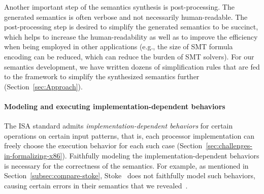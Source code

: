 %
%

Another important step of the semantics synthesis is post-processing. The generated semantics is often verbose and not necessarily human-readable. The post-processing step is desired to simplify the generated semantics to be succinct, which helps to increase the human-readability as well as to improve the efficiency when being employed in other applications (e.g., the size of SMT formula encoding can be reduced, which can reduce the burden of SMT solvers). For our semantics development, we have written dozens of simplification rules that are fed to the \K framework to simplify the synthesized semantics further (Section~\ref{sec:Approach}). 

\paragraph{Modeling and executing implementation-dependent behaviors}

The \ISA ISA standard admits \emph{implementation-dependent behaviors} for
certain operations on certain input patterns, that is, each processor
implementation can freely choose the execution behavior for each such case
(Section~\ref{sec:challenges-in-formalizing-x86}).
%
Faithfully modeling the implementation-dependent behaviors is necessary for the correctness of the
semantics.  For example, as mentioned in Section~\ref{subsec:compare-stoke},
  Stoke~\cite{Stoke2013} does not faithfully model such behaviors, causing
  certain errors in their semantics that we revealed~\cite{BugStoke986}.

